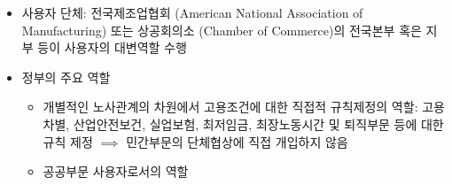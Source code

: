 \documentclass[aspectratio=169,xcolor=dvipsnames,handout]{beamer}
\begin{document}
\begin{frame}[allowframebreaks]
\begin{itemize}[<+->]
    \framebreak%
        \item 사용자 단체: 전국제조업협회 (American National Association of Manufacturing) 또는 상공회의소 (Chamber of Commerce)의 전국본부 혹은 지부 등이 사용자의 대변역할 수행
        \item 정부의 주요 역할
        \begin{itemize}
            \item 개별적인 노사관계의 차원에서 고용조건에 대한 직접적 규칙제정의 역할: 고용차별, 산업안전보건, 실업보험, 최저임금, 최장노동시간 및 퇴직부문 등에 대한 규칙 제정 $\implies$ 민간부문의 단체협상에 직접 개입하지 않음
            \item 공공부문 사용자로서의 역할
        \end{itemize}
    \end{itemize}
\end{frame}
\end{document}
